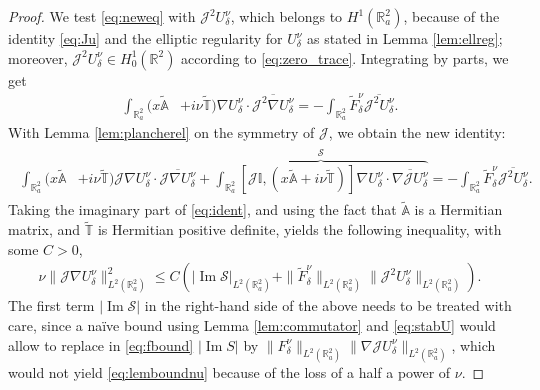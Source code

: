 \documentclass[report]{elsarticle}
\numberwithin{theorem}{section}
\renewcommand{\Im}{\operatorname{Im}}
\begin{document}
\begin{proof}
We test \eqref{eq:neweq} with $\mathcal{J}^2U^{\nu}_{\delta}$, which belongs to $H^1(\mathbb{R}^2_a)$, because of the identity \eqref{eq:Ju}  and the elliptic regularity for $U^{\nu}_{\delta}$ as stated in Lemma \ref{lem:ellreg}; moreover, $\mathcal{J}^2U^{\nu}_{\delta}\in H^1_0(\mathbb{R}^2)$ according to \eqref{eq:zero_trace}. Integrating by parts, we get
\begin{align*}
	\int_{\mathbb{R}^2_a}(x\widetilde{\mathbb{A}}&+i\nu\widetilde{\mathbb{T}})\nabla U^{\nu}_{\delta}\cdot \overline{\mathcal{J}^2\nabla U^{\nu}_{\delta}}=-\int_{\mathbb{R}^2_a}\widetilde{F}^{\nu}_{\delta}\overline{\mathcal{J}^2 U^{\nu}_{\delta}}.
\end{align*}
With Lemma \ref{lem:plancherel} on the symmetry of $\mathcal{J}$, we obtain the new identity:
\begin{align}
	\label{eq:ident}
	\begin{split}
		\int_{\mathbb{R}^2_a}(x\widetilde{\mathbb{A}}&+i\nu\widetilde{\mathbb{T}}) \mathcal{J}\nabla U^{\nu}_{\delta}\cdot \overline{\mathcal{J}\nabla U^{\nu}_{\delta}}+
		\overbrace{\int_{\mathbb{R}^2_a}[\mathcal{J}\mathbb{I},(x\widetilde{\mathbb{A}}+i\nu\widetilde{\mathbb{T}})]\nabla U^{\nu}_{\delta}\cdot \overline{\nabla \mathcal{J}U^{\nu}_{\delta}}}^{\mathcal{S}}=-\int_{\mathbb{R}^2_a}\widetilde{F}^{\nu}_{\delta}\overline{\mathcal{J}^2 U^{\nu}_{\delta}}.	
	\end{split}	
\end{align}
Taking the imaginary part of \eqref{eq:ident}, and using the fact that $\widetilde{\mathbb{A}}$ is a Hermitian matrix, and $\widetilde{\mathbb{T}}$ is Hermitian positive definite, yields the following inequality, with some $C>0$,
\begin{align}
	\label{eq:fbound}
	\nu\|\mathcal{J}\nabla U^{\nu}_{\delta}\|_{L^2(\mathbb{R}^2_a)}^2\leq C\left( |\Im \mathcal{S}|_{L^2(\mathbb{R}^2_a)}+\|\widetilde{F}^{\nu}_{\delta}\|_{L^2(\mathbb{R}^2_a)}\|\mathcal{J}^2 U^{\nu}_{\delta}\|_{L^2(\mathbb{R}^2_a)}\right).
\end{align}
The first term $|\Im\mathcal{S}|$ in the right-hand side of the above needs to be treated with care, since a na\"ive bound using Lemma \ref{lem:commutator} and \eqref{eq:stabU} would allow to replace  in \eqref{eq:fbound} $|\Im S|$ by  $\|F^{\nu}_{\delta}\|_{L^2(\mathbb{R}^2_a)}\|\nabla\mathcal{J}U^{\nu}_{\delta}\|_{L^2(\mathbb{R}^2_a)}$, which would not yield \eqref{eq:lemboundnu} because of the loss of a half a power of $\nu$.  


\end{proof}
\end{document}
